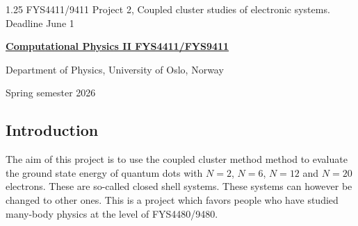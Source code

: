 \documentclass[%
oneside,                 %
final,                   %
10pt]{article}
\begin{document}

\newcommand{\exercisesection}[1]{\subsection*{#1}}






\thispagestyle{empty}

\begin{center}
{\LARGE\bf
\begin{spacing}{1.25}
FYS4411/9411 Project 2, Coupled cluster studies of electronic systems. Deadline June 1
\end{spacing}
}
\end{center}


\begin{center}
{\bf \href{{http://www.uio.no/studier/emner/matnat/fys/FYS4411/index-eng.html}}{Computational Physics II FYS4411/FYS9411}}
\end{center}

    \begin{center}
\centerline{{\small Department of Physics, University of Oslo, Norway}}
\end{center}
    

\begin{center}
Spring semester 2026
\end{center}

\vspace{1cm}


\subsection{Introduction}

The aim of this project is to use the coupled cluster method
method to evaluate 
the ground state energy of 
quantum dots with $N=2$, $N=6$, $N=12$ and $N=20$ electrons. These are so-called closed shell systems.
These systems can however be changed to other ones. This is a project which favors people who have studied many-body physics at the level of FYS4480/9480.
\end{document}
